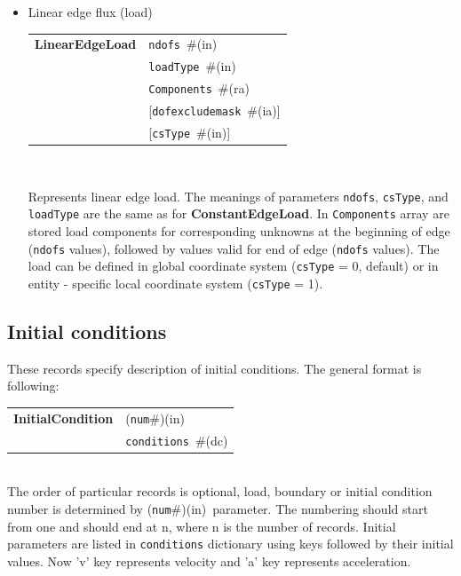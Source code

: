\documentclass[a4paper]{article}
\makeatletter
\newcommand{\param}[1]{\texttt{#1}} %
\newcommand{\optional}[1]{[#1]} %
\newcommand{\field}[2]{\param{#1}~\#{\tiny(#2)}} %
\newcommand{\optField}[2]{\optional{\field{#1}{#2}}}
\newcommand{\componentNum}{(\param{num}\#){\tiny(in)}} %
\newcommand{\entKeywordInst}[1]{\textbf{#1}} %
\newenvironment{record}[1][]{\begin{tabular}{|ll}}{\end{tabular}\\}
\newcommand{\recentry}[2]{{#1}&{#2}\\}
\newcounter{rcc}
\newenvironment{record}[1][\textwidth]{\setcounter{rcc}{0}\begin{tabular*}{#1}{|ll@{\extracolsep{\fill}}r}}{\end{tabular*}\\}
\newcommand{\recentry}[2]{\ifthenelse{\value{rcc}>0}{&$\backslash$ \\}{\setcounter{rcc}{1}}{#1}&{#2}}
\makeatother
\begin{document}
\begin{itemize}
The properties can vary in time. Each property can have associated time function which determines its time variation. The time functions are set up using optional \param{propertytf} dictionary, containing for selected properties the corresponding time function number. The time function must be registered under the same key as in \param{properties} dictionary. The property value is then computed by product of property value (determined by \param{properties}) and corresponding time finction evaluated at given time. If no time function provided for particula property, a unit constant function is assumed.

The load can be defined in global coordinate system (\param{csType} =
0, default) or in entity - specific local coordinate system
(\param{csType} = 1).
\item Linear edge flux (load)

\begin{record}[0.9\textwidth]
  \recentry{\entKeywordInst{LinearEdgeLoad}}{\field{ndofs}{in}}
  \recentry{}{\field{loadType}{in}}
  \recentry{}{\field{Components}{ra}}
  \recentry{}{\optField{dofexcludemask}{ia}}
  \recentry{}{\optField{csType}{in}}
\end{record}

Represents linear edge load. The meanings of parameters \param{ndofs},
\param{csType}, and \param{loadType} are the same as for
\entKeywordInst{ConstantEdgeLoad}. In \param{Components}
array are stored load components for corresponding unknowns at the
beginning of edge (\param{ndofs} values), followed by values valid for
end of edge (\param{ndofs} values). The load can be defined in global coordinate system (\param{csType} =
0, default) or in entity - specific local coordinate system
(\param{csType} = 1).
\end{itemize}


\subsection{Initial conditions}
\label{_InitialConditions}
These records specify description of initial conditions. The general format is
following:

\noindent
\begin{record}
  \recentry{\entKeywordInst{InitialCondition}}{\componentNum}
  \recentry{}{\field{conditions}{dc}}
\end{record}
The order of particular  records is optional, load, boundary or initial condition number is determined by \componentNum\ parameter.
The numbering should start from one and should end at n, where n is the number of records.
Initial parameters are listed in \param{conditions} dictionary using keys followed by their initial values.
Now 'v' key represents velocity and 'a' key represents acceleration.
\end{document}
